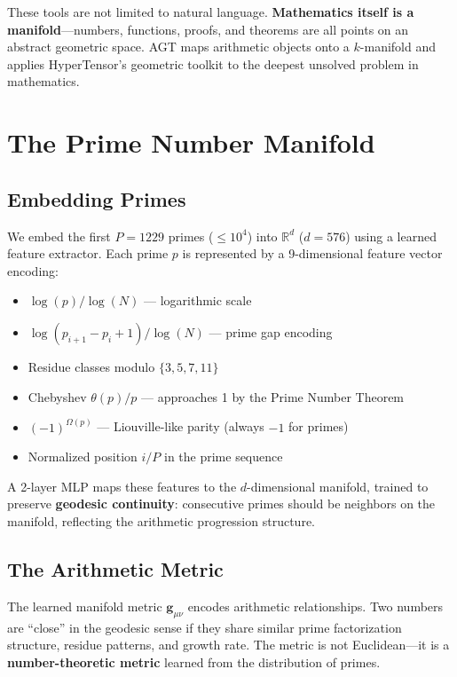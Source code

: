 \documentclass{article}
\begin{document}
These tools are not limited to natural language.  \textbf{Mathematics itself is
a manifold}---numbers, functions, proofs, and theorems are all points on an
abstract geometric space.  AGT maps arithmetic objects onto a $k$-manifold and
applies HyperTensor's geometric toolkit to the deepest unsolved problem in
mathematics.

\section{The Prime Number Manifold}
\label{sec:primes}

\subsection{Embedding Primes}

We embed the first $P = 1229$ primes ($\leq 10^4$) into $\mathbb{R}^d$ ($d=576$)
using a learned feature extractor.  Each prime $p$ is represented by a 9-dimensional
feature vector encoding:

\begin{itemize}
  \item $\log(p)/\log(N)$ --- logarithmic scale
  \item $\log(p_{i+1} - p_i + 1)/\log(N)$ --- prime gap encoding
  \item Residue classes modulo $\{3, 5, 7, 11\}$
  \item Chebyshev $\theta(p)/p$ --- approaches 1 by the Prime Number Theorem
  \item $(-1)^{\Omega(p)}$ --- Liouville-like parity (always $-1$ for primes)
  \item Normalized position $i/P$ in the prime sequence
\end{itemize}

A 2-layer MLP maps these features to the $d$-dimensional manifold, trained
to preserve \textbf{geodesic continuity}: consecutive primes should be
neighbors on the manifold, reflecting the arithmetic progression structure.

\subsection{The Arithmetic Metric}

The learned manifold metric $\mathbf{g}_{\mu\nu}$ encodes arithmetic
relationships.  Two numbers are ``close'' in the geodesic sense if they
share similar prime factorization structure, residue patterns, and
growth rate.  The metric is not Euclidean---it is a \textbf{number-theoretic
metric} learned from the distribution of primes.
\end{document}
